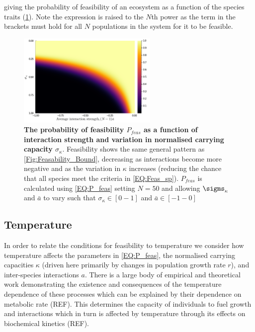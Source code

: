 \documentclass{article}
\begin{document}
giving the probability of feasibility of an ecosystem as a function of the species traits (\cref{Fig:P_feas}). Note the expression is raised to the $N$th power as the term in the brackets must hold for all $N$ populations in the system for it to be feasible. 

\begin{figure}
    \centering
    \includegraphics[width = 0.6\textwidth]{docs/Figures/Fig_2.pdf}
    \caption{\textbf{The probability of feasibility $P_{feas}$ as a function of interaction strength and variation in normalised carrying capacity $\sigma_{\kappa}$}. Feasibility shows the same general pattern as \cref{Fig:Feasability_Bound}, decreasing as interactions become more negative and as the variation in $\kappa$ increases (reducing the chance that all species meet the criteria in \cref{EQ:Feas_sp}). $P_{feas}$ is calculated using \cref{EQ:P_feas} setting $N=50$ and allowing $\sigms_{\kappa}$ and $\bar{a}$ to vary such that $\sigma_{\kappa} \in [0 - 1]$ and $\bar{a} \in [-1 - 0]$}
    \label{Fig:P_feas}
\end{figure}

\subsection{Temperature} \label{SEC:Temperature}
In order to relate the conditions for feasibility to temperature we consider how temperature affects the parameters in \cref{EQ:P_feas}, the normalised carrying capacities $\kappa$ (driven here primarily by changes in population growth rate $r$), and inter-species interactions $a$. There is a large body of empirical and theoretical work demonstrating the existence and consequences of the temperature dependence of these processes which can be explained by their dependence on metabolic rate (REF). This determines the capacity of individuals to fuel growth and interactions which in turn is affected by temperature through its effects on biochemical kinetics (REF).
\end{document}
